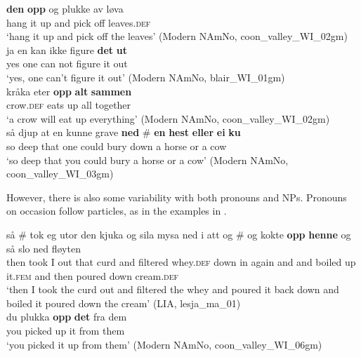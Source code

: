 \documentclass[output=paper]{langscibook}
\begin{document}
\ea%
    \label{ex:larsson:30}
    \ea
     \textbf{den} \textbf{opp} og plukke av løva\\
            hang it up and pick off leaves.\textsc{def}\\
    \glt    ‘hang it up and pick off the leaves’  (Modern NAmNo, coon\_valley\_WI\_02gm)\label{ex:larsson:30a}\\
    \ex 
    \gll ja en kan ikke figure \textbf{det} \textbf{ut}\\
         yes one can not figure it out \\
    \glt ‘yes, one can’t figure it out’ (Modern NAmNo, blair\_WI\_01gm)\label{ex:larsson:30b}\\
    \z %
\ex%
    \label{ex:larsson:31}
    \ea  
    \gll kråka eter \textbf{opp} \textbf{alt} \textbf{sammen}\\
         crow.\textsc{def} eats up all together\\
    \glt ‘a crow will eat up everything’ (Modern NAmNo, coon\_valley\_WI\_02gm\label{ex:larsson:31a})\\
    \ex  
    \gll så djup at en kunne grave \textbf{{ned}} \# \textbf{en} \textbf{hest} \textbf{eller} \textbf{ei} \textbf{ku}\\
         so deep that one could bury down {} a horse or a cow\\
    \glt ‘so deep that you could bury a horse or a cow’ (Modern NAmNo, coon\_valley\_WI\_03gm)\label{ex:larsson:31b}\\ 
    \z %
\z

However, there is also some variability with both pronouns and NPs. Pronouns on occasion follow particles, as in the examples in .

\ea%
    \label{ex:larsson:32}
    \ea 
    \gll så \# tok eg utor den kjuka og sila mysa ned i att og \# og kokte \textbf{opp} \textbf{henne} og så slo ned fløyten\\
         then {} took I out that curd and filtered  whey.\textsc{def} down in again and {} and boiled up it.\textsc{fem} and then poured down cream.\textsc{def}\\
    \glt ‘then I took the curd out and filtered the whey and poured it back down and boiled it poured down the cream’ (LIA, lesja\_ma\_01)\label{ex:larsson:32a}\\
    \ex 
    \gll du plukka \textbf{opp} \textbf{det} fra dem\\
         you picked up it from them\\
	\glt ‘you picked it up from them’ (Modern NAmNo, coon\_valley\_WI\_06gm)\label{ex:larsson:32b}\\
    \z %
\z
\end{document}

